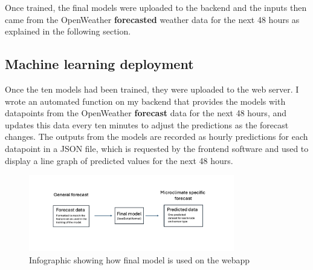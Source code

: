 Once trained, the final models were uploaded to the backend and the inputs then
came from the OpenWeather \textbf{forecasted} weather data for the next 48 hours
as explained in the following section.


\subsection{Machine learning deployment}

Once the ten models had been trained, they were uploaded to the web server.  I
wrote an automated function on my backend that provides the models with
datapoints from the OpenWeather \textbf{forecast} data for the next 48 hours,
and updates this data every ten minutes to adjust the predictions as the
forecast changes. The outputs from the models are recorded as hourly predictions
for each datapoint in a JSON file, which is requested by the frontend software
and used to display a line graph of predicted values for the next 48 hours.

\begin{figure}[H]
    \centering
    \includegraphics[width=0.8\textwidth]{contents/part-3/fig3/model_diagram.png}
    \caption{Infographic showing how final model is used on the webapp}
    \label{fig:model_diagram}
\end{figure}

